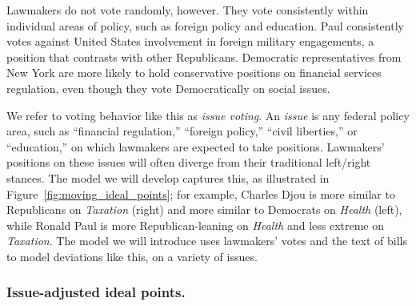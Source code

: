 Lawmakers do not vote randomly, however.  They vote consistently
within individual areas of policy, such as foreign policy and
education.  Paul consistently votes against United States involvement
in foreign military engagements, a position that contrasts with other
Republicans.  Democratic representatives from New York are more likely
to hold conservative positions on financial services regulation, even
though they vote Democratically on social issues.

We refer to voting behavior like this as \emph{issue voting}.  An
\emph{issue} is any federal policy area, such as ``financial
regulation,'' ``foreign policy,'' ``civil liberties,'' or
``education,'' on which lawmakers are expected to take positions.
Lawmakers' positions on these issues will often diverge from their
traditional left/right stances.  The model we will develop captures
this, as illustrated in Figure~\ref{fig:moving_ideal_points}; for
example, Charles Djou is more similar to Republicans on
\emph{Taxation} (right) and more similar to Democrats on \emph{Health}
(left), while Ronald Paul is more Republican-leaning on \emph{Health}
and less extreme on \emph{Taxation}. The model we will introduce uses
lawmakers' votes and the text of bills to model deviations like this,
on a variety of issues.





\subsubsection{Issue-adjusted ideal points.}



